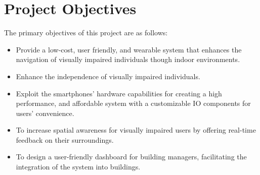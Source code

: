 \section{Project Objectives}

The primary objectives of this project are as follows:

\begin{itemize}
	\item Provide a low-cost, user friendly, and wearable system that enhances the navigation of visually impaired individuals though indoor environments.
	\item Enhance the independence of visually impaired individuals.
	\item Exploit the smartphones' hardware capabilities for creating a high performance, and affordable system with a customizable IO components for users' convenience.
	\item To increase spatial awareness for visually impaired users by offering real-time feedback on their surroundings.
	\item To design a user-friendly dashboard for building managers, facilitating the integration of the system into buildings.
\end{itemize}
